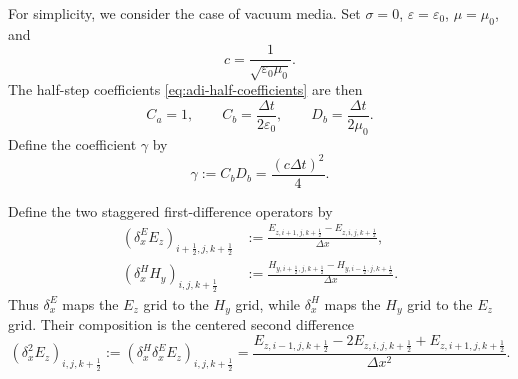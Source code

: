 \documentclass{article}
\numberwithin{equation}{section}
\numberwithin{figure}{section}
\begin{document}
For simplicity, we consider the case of vacuum media. Set $\sigma=0$, $\varepsilon=\varepsilon_0$, $\mu=\mu_0$, and
\begin{equation}
    c=\frac{1}{\sqrt{\varepsilon_0\mu_0}}.
\end{equation}
The half-step coefficients \eqref{eq:adi-half-coefficients} are then
\begin{equation}
    C_a=1,\qquad
    C_b=\frac{\Delta t}{2\varepsilon_0},\qquad
    D_b=\frac{\Delta t}{2\mu_0}.
    \label{eq:adi-dispersion-vacuum-coefficients}
\end{equation}
Define the coefficient $\gamma$ by
\begin{equation}
    \gamma:=C_bD_b=\frac{(c\Delta t)^2}{4}.
\end{equation}

Define the two staggered first-difference operators by
\begin{subequations}
    \begin{align}
        \left(\delta_x^{E}E_z\right)_{i+\tfrac12,j,k+\tfrac12}
         & :=\frac{E_{z,i+1,j,k+\tfrac12}-E_{z,i,j,k+\tfrac12}}{\Delta x},
        \label{eq:adi-delta-x-E}                                                           \\
        \left(\delta_x^{H}H_y\right)_{i,j,k+\tfrac12}
         & :=\frac{H_{y,i+\tfrac12,j,k+\tfrac12}-H_{y,i-\tfrac12,j,k+\tfrac12}}{\Delta x}.
        \label{eq:adi-delta-x-H}
    \end{align}
    \label{eq:adi-delta-x-operators}
\end{subequations}
Thus $\delta_x^{E}$ maps the $E_z$ grid to the $H_y$ grid, while $\delta_x^{H}$ maps the $H_y$ grid to the $E_z$ grid. Their composition is the centered second difference
\begin{equation}
    \left(\delta_x^2E_z\right)_{i,j,k+\tfrac12}
    :=\left(\delta_x^{H}\delta_x^{E}E_z\right)_{i,j,k+\tfrac12}
    =\frac{E_{z,i-1,j,k+\tfrac12}-2E_{z,i,j,k+\tfrac12}
    +E_{z,i+1,j,k+\tfrac12}}{\Delta x^2}.
    \label{eq:adi-delta-x-squared}
\end{equation}
\end{document}
